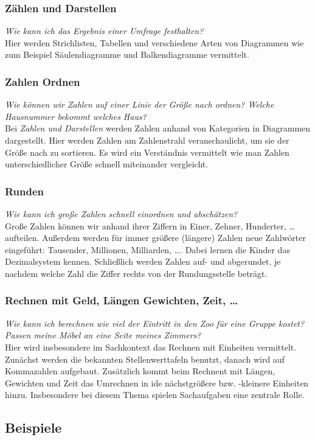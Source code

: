 \documentclass{article}
\begin{document}
\subsubsection*{Zählen und Darstellen}
\textit{Wie kann ich das Ergebnis einer Umfrage festhalten? } \\Hier werden Strichlisten, Tabellen und verschiedene Arten von Diagrammen wie zum Beispiel Säulendiagramme und Balkendiagramme vermittelt.
\subsubsection*{Zahlen Ordnen}
\textit{Wie können wir Zahlen auf einer Linie der Größe nach ordnen? Welche Hausnummer bekommt welches Haus? }\\
Bei \textit{Zahlen und Darstellen} werden Zahlen anhand von Kategorien in Diagrammen dargestellt. Hier werden Zahlen am Zahlenstrahl veranschaulicht, um sie der Größe nach zu sortieren.
Es wird ein Verständnis vermittelt wie man Zahlen unterschiedlicher Größe schnell miteinander vergleicht.
\subsubsection*{Runden}
\textit{Wie kann ich große Zahlen schnell einordnen und abschätzen?}\\
Große Zahlen können wir anhand ihrer Ziffern in Einer, Zehner, Hunderter, \ldots aufteilen. Außerdem werden für immer größere (längere) Zahlen neue Zahlwörter eingeführt: Tausender, Millionen, Milliarden, \ldots. Dabei lernen die Kinder das Dezimalsystem kennen.
Schließlich werden Zahlen auf- und abgerundet, je nachdem welche Zahl die Ziffer rechts von der Rundungsstelle beträgt.
\subsubsection*{Rechnen mit Geld, Längen Gewichten, Zeit, \ldots}
\textit{Wie kann ich berechnen wie viel der Eintritt in den Zoo für eine Gruppe kostet? Passen meine Möbel an eine Seite meines Zimmers?}\\
Hier wird insbesondere im Sachkontext das Rechnen mit Einheiten vermittelt. Zunächst werden die bekannten Stellenwerttafeln benutzt, danach wird auf Kommazahlen aufgebaut.
Zusätzlich kommt beim Rechnent mit Längen, Gewichten und Zeit das Umrechnen in ide nächstgrößere bzw. -kleinere Einheiten hinzu. Insbesondere bei diesem Thema spielen Sachaufgaben eine zentrale Rolle.
\subsection{Beispiele}
\end{document}
